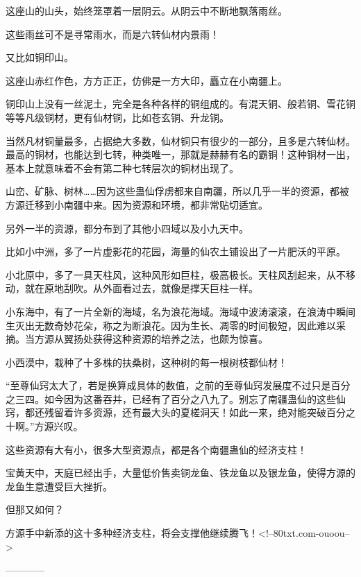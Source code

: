 \begin{this_body}
这座山的山头，始终笼罩着一层阴云。从阴云中不断地飘落雨丝。

这些雨丝可不是寻常雨水，而是六转仙材内景雨！

又比如铜印山。

这座山赤红作色，方方正正，仿佛是一方大印，矗立在小南疆上。

铜印山上没有一丝泥土，完全是各种各样的铜组成的。有混天铜、般若铜、雪花铜等等凡级铜材，更有仙材铜，比如苍玄铜、升龙铜。

当然凡材铜量最多，占据绝大多数，仙材铜只有很少的一部分，且多是六转仙材。最高的铜材，也能达到七转，种类唯一，那就是赫赫有名的霸铜！这种铜材一出，基本上就意味着不会有第二种七转层次的铜材出现了。

山峦、矿脉、树林……因为这些蛊仙俘虏都来自南疆，所以几乎一半的资源，都被方源迁移到小南疆中来。因为资源和环境，都非常贴切适宜。

另外一半的资源，都分布到了其他小四域以及小九天中。

比如小中洲，多了一片虚影花的花园，海量的仙农土铺设出了一片肥沃的平原。

小北原中，多了一具天柱风，这种风形如巨柱，极高极长。天柱风刮起来，从不移动，就在原地刮吹。从外面看过去，就像是撑天巨柱一样。

小东海中，有了一片全新的海域，名为浪花海域。海域中波涛滚滚，在浪涛中瞬间生灭出无数奇妙花朵，称之为断浪花。因为生长、凋零的时间极短，因此难以采摘。当方源从翼扬处获得这种资源的培养之法，也颇为惊喜。

小西漠中，栽种了十多株的扶桑树，这种树的每一根树枝都仙材！

“至尊仙窍太大了，若是换算成具体的数值，之前的至尊仙窍发展度不过只是百分之三四。如今因为这番吞并，已经有了百分之八九了。别忘了南疆蛊仙的这些仙窍，都还残留着许多资源，还有最大头的夏槎洞天！如此一来，绝对能突破百分之十啊。”方源兴叹。

这些资源有大有小，很多大型资源点，都是各个南疆蛊仙的经济支柱！

宝黄天中，天庭已经出手，大量低价售卖铜龙鱼、铁龙鱼以及银龙鱼，使得方源的龙鱼生意遭受巨大挫折。

但那又如何？

方源手中新添的这十多种经济支柱，将会支撑他继续腾飞！<!--80txt.com-ouoou-->

------------

\end{this_body}

